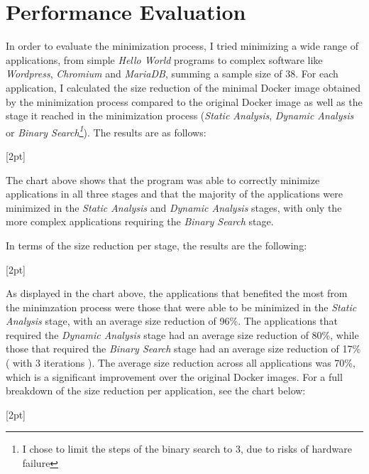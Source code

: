 \chapter{Performance Evaluation}
\label{chapter:performance-evaluation}

In order to evaluate the minimization process, I tried minimizing a wide range of applications, from simple \textit{Hello World} programs to complex 
software like \textit{Wordpress}, \textit{Chromium} and \textit{MariaDB}, summing a sample size of 
38. For each application, I calculated the size reduction of the minimal Docker image obtained by the minimization process compared to the 
original Docker image as well as the stage it reached in the minimization process (\textit{Static Analysis}, \textit{Dynamic Analysis} or \textit{Binary Search\footnote{I chose to limit the steps of the binary search to 3, due to risks of hardware failure }}).
The results are as follows:

[2pt]

The chart above shows that the program was able to correctly minimize applications in all three stages and that the majority of the applications were minimized in the 
\textit{Static Analysis} and \textit{Dynamic Analysis} stages, with only the more complex applications requiring the \textit{Binary Search} stage.

In terms of the size reduction per stage, the results are the following:

[2pt]

As displayed in the chart above, the applications that benefited the most from the minimzation process were those that were able to be minimized in the \textit{Static Analysis} stage, with an average size reduction of 96\%. The applications that required the \textit{Dynamic Analysis} stage had an average size reduction of 80\%, while those that required the \textit{Binary Search} stage had an average size reduction of 17\% ( with 3 iterations ).
The average size reduction across all applications was 70\%, which is a significant improvement over the original Docker images.
For a full breakdown of the size reduction per application, see the chart below: 

[2pt]

